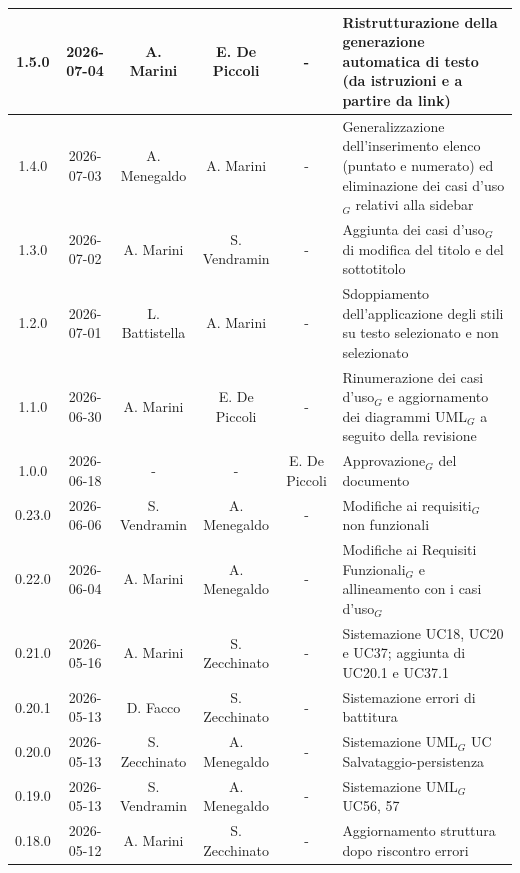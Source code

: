 \documentclass[a4paper, 10pt]{article}
\begin{document}
\begin{longtable}{|c|c|c|c|c|p{3cm}|}
    1.5.0 & 2026-07-04 & A. Marini & E. De Piccoli & - & Ristrutturazione della generazione automatica di testo (da istruzioni e a partire da link)\\ \hline

    1.4.0 & 2026-07-03 & A. Menegaldo & A. Marini & - & Generalizzazione dell'inserimento elenco (puntato e numerato) ed eliminazione dei casi d'uso$_G$ relativi alla sidebar\\ \hline

    1.3.0 & 2026-07-02 & A. Marini & S. Vendramin & - & Aggiunta dei casi d'uso$_G$ di modifica del titolo e del sottotitolo\\ \hline

    1.2.0 & 2026-07-01 & L. Battistella & A. Marini & - & Sdoppiamento dell'applicazione degli stili su testo selezionato e non selezionato\\ \hline

    1.1.0 & 2026-06-30 & A. Marini & E. De Piccoli & - & Rinumerazione dei casi d'uso$_G$ e aggiornamento dei diagrammi UML$_G$ a seguito della revisione\\ \hline

    1.0.0 & 2026-06-18 & - & - & E. De Piccoli & Approvazione$_G$ del documento\\ \hline

    0.23.0 & 2026-06-06 & S. Vendramin & A. Menegaldo & - & Modifiche ai requisiti$_G$ non funzionali \\ \hline

    0.22.0 & 2026-06-04 & A. Marini & A. Menegaldo & - & Modifiche ai Requisiti Funzionali$_G$ e allineamento con i casi d'uso$_G$\\ \hline

    0.21.0 & 2026-05-16 & A. Marini & S. Zecchinato & - & Sistemazione UC18, UC20 e UC37; aggiunta di UC20.1 e UC37.1\\ \hline

    0.20.1 & 2026-05-13 & D. Facco & S. Zecchinato & - & Sistemazione errori di battitura\\ \hline

    0.20.0 & 2026-05-13 & S. Zecchinato & A. Menegaldo & - & Sistemazione UML$_G$ UC Salvataggio-persistenza\\ \hline

    0.19.0 & 2026-05-13 & S. Vendramin & A. Menegaldo & - & Sistemazione UML$_G$ UC56, 57\\ \hline

    0.18.0 & 2026-05-12 & A. Marini & S. Zecchinato & - & Aggiornamento struttura dopo riscontro errori\\ \hline


\end{longtable}
\end{document}
